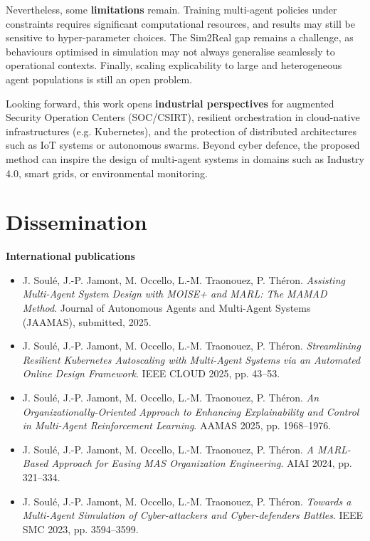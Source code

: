 \documentclass[a4paper,10pt,twocolumn]{article}
\begin{document}
Nevertheless, some \textbf{limitations} remain. Training multi-agent
policies under constraints requires significant computational resources,
and results may still be sensitive to hyper-parameter choices. The
Sim2Real gap remains a challenge, as behaviours optimised in simulation
may not always generalise seamlessly to operational contexts. Finally,
scaling explicability to large and heterogeneous agent populations is
still an open problem.

Looking forward, this work opens \textbf{industrial perspectives} for
augmented Security Operation Centers (SOC/CSIRT), resilient orchestration
in cloud-native infrastructures (e.g. Kubernetes), and the protection of
distributed architectures such as IoT systems or autonomous swarms.
Beyond cyber defence, the proposed method can inspire the design of
multi-agent systems in domains such as Industry 4.0, smart grids, or
environmental monitoring.



\section*{Dissemination}

\noindent\textbf{International publications}
\begin{itemize}
    \item J. Soulé, J.-P. Jamont, M. Occello, L.-M. Traonouez, P. Théron.
          \textit{Assisting Multi-Agent System Design with MOISE+ and MARL: The MAMAD Method}.
          Journal of Autonomous Agents and Multi-Agent Systems (JAAMAS), submitted, 2025.
    \item J. Soulé, J.-P. Jamont, M. Occello, L.-M. Traonouez, P. Théron.
          \textit{Streamlining Resilient Kubernetes Autoscaling with Multi-Agent Systems via an Automated Online Design Framework}.
          IEEE CLOUD 2025, pp. 43–53.
    \item J. Soulé, J.-P. Jamont, M. Occello, L.-M. Traonouez, P. Théron.
          \textit{An Organizationally-Oriented Approach to Enhancing Explainability and Control in Multi-Agent Reinforcement Learning}.
          AAMAS 2025, pp. 1968–1976.
    \item J. Soulé, J.-P. Jamont, M. Occello, L.-M. Traonouez, P. Théron.
          \textit{A MARL-Based Approach for Easing MAS Organization Engineering}.
          AIAI 2024, pp. 321–334.
    \item J. Soulé, J.-P. Jamont, M. Occello, L.-M. Traonouez, P. Théron.
          \textit{Towards a Multi-Agent Simulation of Cyber-attackers and Cyber-defenders Battles}.
          IEEE SMC 2023, pp. 3594–3599.
\end{itemize}
\end{document}

